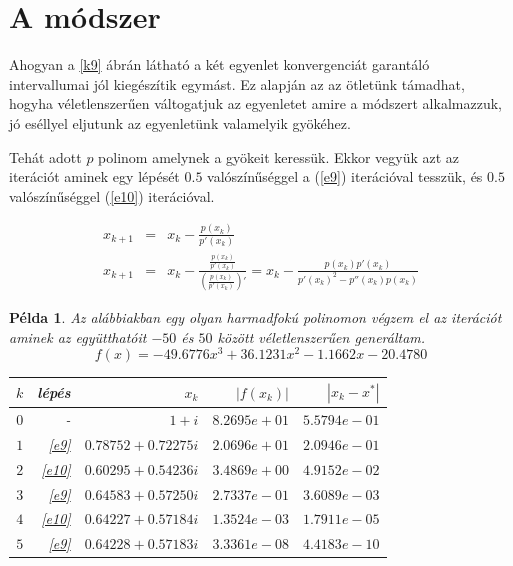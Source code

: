 \documentclass[a4paper,12pt]{report}
\newtheorem{Pl}[Tet]{Példa}
\begin{document}
            \section{A módszer}
            
            Ahogyan a \ref{k9} ábrán látható a két egyenlet konvergenciát garantáló intervallumai jól kiegészítik egymást. Ez alapján az az ötletünk támadhat, hogyha véletlenszerűen váltogatjuk az egyenletet amire a módszert alkalmazzuk, jó eséllyel eljutunk az egyenletünk valamelyik gyökéhez.
			
			Tehát adott $p$ polinom amelynek a gyökeit keressük. Ekkor vegyük azt az iterációt aminek egy lépését $0.5$ valószínűséggel a (\ref{e9}) iterációval tesszük, és $0.5$ valószínűséggel (\ref{e10}) iterációval. 
			
			\begin{eqnarray}
				\label{e9}x_{k+1}&=&x_k- \frac{p(x_k)}{p'(x_k)}\\
				\label{e10}x_{k+1}&=&x_k-\frac{\frac{p(x_k)}{p'(x_k)}}{\left(\frac{p(x_k)}{p'(x_k)}\right)'}=x_k-\frac{p(x_k)p'(x_k)}{p'(x_k)^2-p''(x_k)p(x_k)}
			\end{eqnarray}
			
            \begin{Pl} Az alábbiakban egy olyan harmadfokú polinomon végzem el az iterációt aminek az együtthatóit $-50$ és $50$ között véletlenszerűen generáltam.
            	\[f(x)=-49.6776x^3+36.1231x^2-1.1662x-20.4780\]
                \begin{center}
                \begin{tabular}{|r|r|r|r|r|}
               		\hline
                	$k$ & lépés     & $x_k$                 & $|f(x_k)|$   & $|x_k-x^*|$  \\ \hline
                	$0$ & -         & $1+i$                 & $8.2695e+01$ & $5.5794e-01$ \\ 
                	$1$ & \ref{e9}  & $0.78752 + 0.72275i$  & $2.0696e+01$ & $2.0946e-01$ \\ 
                	$2$ & \ref{e10} & $0.60295 + 0.54236i$  & $3.4869e+00$ & $4.9152e-02$ \\ 
                	$3$ & \ref{e9}  & $0.64583 + 0.57250i$  & $2.7337e-01$ & $3.6089e-03$ \\ 
                	$4$ & \ref{e10} & $0.64227 + 0.57184i $ & $1.3524e-03$ & $1.7911e-05$ \\ 
                	$5$ & \ref{e9}  & $0.64228 + 0.57183i$  & $3.3361e-08$ & $4.4183e-10$ \\
                	\hline
                \end{tabular}
                \end{center}
                
            \end{Pl}
            
\end{document}
